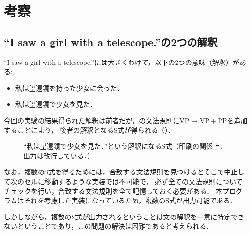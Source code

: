 \documentclass[uplatex, dvipdfmx, a4paper, twocolumn]{jsarticle}
\begin{document}
  \section{考察}\label{kousatu}
    \subsection{``I saw a girl with a telescope.''の2つの解釈}
    ``I saw a girl with a telescope.''には大きくわけて，以下の2つの意味（解釈）がある:
    \begin{itemize}
      \item 私は望遠鏡を持った少女に会った．
      \item 私は望遠鏡で少女を見た．
    \end{itemize}
    今回の実験の結果得られた解釈は前者だが，の文法規則に\(\text{VP} \to \text{VP} + \text{PP}\)を追加することにより，
    後者の解釈となるS式が得られる（）．
    \begin{figure}[htpb]
      \centering
      \caption{``私は望遠鏡で少女を見た．''という解釈になるS式（印刷の関係上，出力は改行している．）}
      \label{fig:result_telescope}
    \end{figure}

    なお，複数のS式を得るためには，合致する文法規則を見つけるとそこで中止して次のセルに移動するような実装では不可能で，
    必ず全ての文法規則についてチェックを行い，合致する文法規則を全て記憶しておく必要がある．
    本プログラムはそれを考慮した実装になっているため，複数のS式が出力可能である．

    しかしながら，複数のS式が出力されるということは文の解釈を一意に特定できないということであり，この問題の解決は困難であると考えられる．
\end{document}
